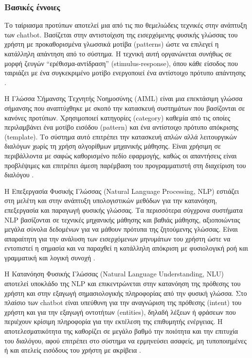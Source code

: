 \documentclass{article}
\begin{document}
\subsubsection{Βασικές έννοιες}
\par Το ταίριασμα προτύπων αποτελεί μια από τις πιο θεμελιώδεις τεχνικές στην ανάπτυξη των chatbot. Βασίζεται στην αντιστοίχιση της εισερχόμενης φυσικής γλώσσας του χρήστη με προκαθορισμένα γλωσσικά μοτίβα (patterns) ώστε να επιλεγεί η κατάλληλη απάντηση από το σύστημα. Η τεχνική αυτή οργανώνεται συνήθως σε μορφή ζευγών “ερέθισμα-αντίδραση” (stimulus-response), όπου κάθε είσοδος που ταιριάζει με ένα συγκεκριμένο μοτίβο ενεργοποιεί ένα αντίστοιχο πρότυπο απάντησης \cite{ramesh-2017}.
\par Η Γλώσσα Σήμανσης Τεχνητής Νοημοσύνης (AIML) είναι μια επεκτάσιμη γλώσσα σήμανσης που αναπτύχθηκε με σκοπό την κατασκευή συστημάτων που βασίζονται σε κανόνες προτύπων. Χρησιμοποιεί κατηγορίες (category) καθεμία από τις οποίες περιλαμβάνει ένα μοτίβο εισόδου (pattern) και ένα αντίστοιχο πρότυπο απόκρισης (template). Το σύστημα αυτό επιτρέπει την κατασκευή απλών αλλά λειτουργικών διαλόγων χωρίς τη χρήση αλγορίθμων μηχανικής μάθησης. Είναι χρήσιμη σε περιβάλλοντα με σαφώς καθορισμένο πεδίο εφαρμογής, καθώς οι απαντήσεις είναι προβλέψιμες και επιτρέπει άμεση παρέμβαση του προγραμματιστή στη διαχείριση του διαλόγου \cite{marietto-2013}.
\par Η Επεξεργασία Φυσικής Γλώσσας (Natural Language Processing, NLP) εστιάζει στη μελέτη και στην ανάπτυξη υπολογιστικών μεθόδων για την κατανόηση, επεξεργασία και παραγωγή φυσικής γλώσσας. Τα περισσότερα σύγχρονα συστήματα NLP βασίζονται σε τεχνικές μηχανικής μάθησης και βαθιάς μάθησης, αξιοποιώντας μεγάλα σύνολα δεδομένων για να μάθουν πρότυπα της ζητούμενης γλώσσας. Είναι απαραίτητη για την ανάλυση των εισερχόμενων μηνυμάτων του χρήστη ώστε να εντοπιστεί η σημασία και να παραχθεί η κατάλληλη απόκριση με φυσιολογική ροή και γραμματική και λογική συνοχή \cite{adamopoulou-2020}.
\par Η Κατανόηση Φυσικής Γλώσσας (Natural Language Understanding, NLU) αποτελεί υποκλάδο της NLP και επικεντρώνεται στην κατανόηση της πρόθεσης του χρήστη και στην εξαγωγή σημασιολογικής πληροφορίας από την φυσική γλώσσα. Στο πλαίσιο των chatbot είναι υπεύθυνη για την αναγνώριση της πρόθεσης (intent) του χρήστη και για την εξαγωγή οντοτήτων (entities), δηλαδή λέξεων ή φράσεων που περιέχουν κρίσιμη πληροφορία για την εκτέλεση της επιθυμητής ενέργειας. Η αποτελεσματικότητα της καθορίζει σε μεγάλο βαθμό την ποιότητα και την επιτυχία του διαλόγου, αφού επιτρέπει στο σύστημα να ερμηνεύσει ασαφείς, μη τυποποιημένες ή και ατελείς εισόδους του χρήστη με ακρίβεια \cite{adamopoulou-2020}.
\end{document}
